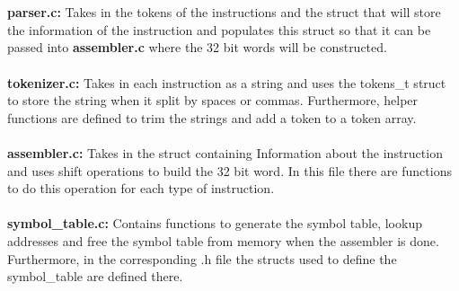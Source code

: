 \documentclass[a4paper]{article}
\begin{document}
\\\\
\textbf{parser.c: } Takes in the tokens of the instructions and the struct that will store the information of the instruction and populates this struct so that it can be passed into \textbf{assembler.c} where the 32 bit words will be constructed. 
\\\\
\textbf{tokenizer.c: } Takes in each instruction as a string and uses the tokens\_t struct to store the string when it split by spaces or commas. Furthermore, helper functions are defined to trim the strings and add a token to a token array. 
\\\\
\textbf{assembler.c: } Takes in the struct containing Information about the instruction and uses shift operations to build the 32 bit word. In this file there are functions to do this operation for each type of instruction.
\\\\
\textbf{symbol\_table.c: } Contains functions to generate the symbol table, lookup addresses and free the symbol table from memory when the assembler is done. Furthermore, in the corresponding .h file the structs used to define the symbol\_table are defined there. 
\\\\
\end{document}
